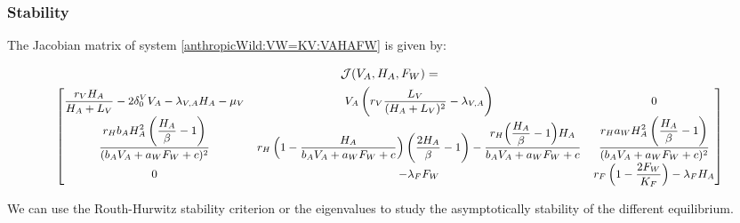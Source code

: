 \documentclass{article}
\newcommand{\lva}{\lambda_{V, A}}
\newcommand{\lfw}{\lambda_{F}}
\newcommand{\dv}{\delta_0^V}
\begin{document}
\subsubsection{Stability}

The Jacobian matrix of system \eqref{anthropicWild:VW=KV:VAHAFW} is given by:

\begin{multline}
\mathcal{J}(V_A, H_A,F_W) = \\
{\small
\begin{bmatrix}
\dfrac{r_V H_A}{H_A+L_V}- 2\dv V_A - \lva H_A - \mu_V &  V_A\left(r_V \dfrac{L_V}{(H_A+L_V)^2} - \lva \right) & 0\\
\dfrac{r_H b_A H_A^2 \left(\dfrac{H_A}{\beta}-1\right)}{(b_A V_A + a_WF_W + c)^2}  & r_H \left(1-\dfrac{H_A}{b_A V_A + a_W F_W +c} \right)\left(\dfrac{2H_A}{\beta}-1\right) - \dfrac{r_H \Big(\dfrac{H_A}{\beta}-1\Big)H_A}{b_A V_A + a_WF_W + c} & \dfrac{r_H a_W H_A^2 \left(\dfrac{H_A}{\beta}-1\right)}{(b_A V_A + a_WF_W + c)^2} \\
0 & -\lfw F_W & r_F \left(1 - \dfrac{2F_W}{K_F}\right) -\lfw H_A 
\end{bmatrix}}
\end{multline}

We can use the Routh-Hurwitz stability criterion or the eigenvalues to study the asymptotically stability of the different equilibrium.
\end{document}
